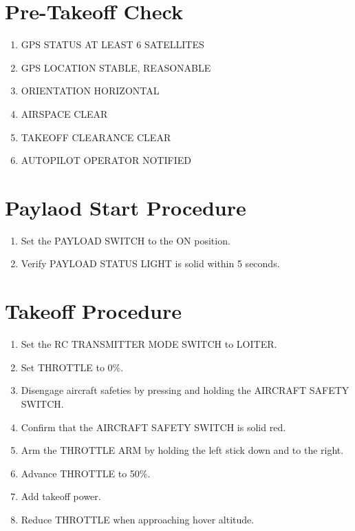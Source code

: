 \documentclass{report}
\begin{document}
	\section{Pre-Takeoff Check}
		\begin{enumerate}
			\item GPS STATUS \hrulefill AT LEAST 6 SATELLITES
			\item GPS LOCATION \hrulefill STABLE, REASONABLE
			\item ORIENTATION \hrulefill HORIZONTAL
			\item AIRSPACE \hrulefill CLEAR
			\item TAKEOFF CLEARANCE \hrulefill CLEAR
			\item AUTOPILOT OPERATOR \hrulefill NOTIFIED
		\end{enumerate}
	\section{Paylaod Start Procedure}
		\begin{enumerate}
			\item Set the PAYLOAD SWITCH to the ON position.
			\item Verify PAYLOAD STATUS LIGHT is solid within 5 seconds.
		\end{enumerate}
	\section{Takeoff Procedure}
		\begin{enumerate}
			\item Set the RC TRANSMITTER MODE SWITCH to LOITER.
			\item Set THROTTLE to 0\%.
			\item Disengage aircraft safeties by pressing and holding the AIRCRAFT SAFETY SWITCH.
			\item Confirm that the AIRCRAFT SAFETY SWITCH is solid red.
			\item Arm the THROTTLE ARM by holding the left stick down and to the right.
			\item Advance THROTTLE to 50\%.
			\item Add takeoff power.
			\item Reduce THROTTLE when approaching hover altitude.
		\end{enumerate}
\end{document}

